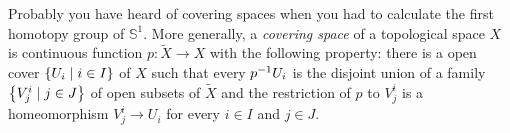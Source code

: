 \begin{example}
Probably you have heard of covering spaces when you had to calculate the first homotopy group of \(\mathbb S^1\). More generally, a {\em covering space} of a topological space \(X\) is continuous function \(p : \tilde X \to X\) with the following property: there is a open cover \(\left\{U_i \mid i \in I\right\}\) of \(X\) such that every \(p^{-1} U_i\) is the disjoint union of a family \(\left\{V_j^i \mid j \in J\right\}\) of open subsets of \(\tilde X\) and the restriction of \(p\) to \(V_j^i\) is a homeomorphism \(V_j^i \to U_i\) for every \(i \in I\) and \(j \in J\). 
\end{example}

\begin{example}
\end{example}

